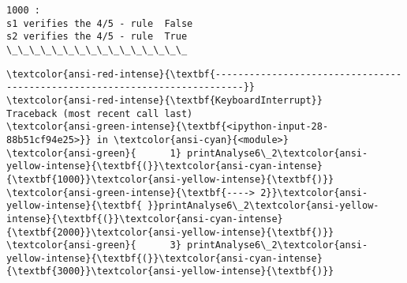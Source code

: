\documentclass[11pt]{article}
\begin{document}
    \begin{Verbatim}[commandchars=\\\{\}]
1000 :
s1 verifies the 4/5 - rule  False
s2 verifies the 4/5 - rule  True
\_\_\_\_\_\_\_\_\_\_\_\_\_\_\_\_
    \end{Verbatim}

    \begin{Verbatim}[commandchars=\\\{\}, frame=single, framerule=2mm, rulecolor=\color{outerrorbackground}]
\textcolor{ansi-red-intense}{\textbf{---------------------------------------------------------------------------}}
\textcolor{ansi-red-intense}{\textbf{KeyboardInterrupt}}                         Traceback (most recent call last)
\textcolor{ansi-green-intense}{\textbf{<ipython-input-28-88b51cf94e25>}} in \textcolor{ansi-cyan}{<module>}
\textcolor{ansi-green}{      1} printAnalyse6\_2\textcolor{ansi-yellow-intense}{\textbf{(}}\textcolor{ansi-cyan-intense}{\textbf{1000}}\textcolor{ansi-yellow-intense}{\textbf{)}}
\textcolor{ansi-green-intense}{\textbf{----> 2}}\textcolor{ansi-yellow-intense}{\textbf{ }}printAnalyse6\_2\textcolor{ansi-yellow-intense}{\textbf{(}}\textcolor{ansi-cyan-intense}{\textbf{2000}}\textcolor{ansi-yellow-intense}{\textbf{)}}
\textcolor{ansi-green}{      3} printAnalyse6\_2\textcolor{ansi-yellow-intense}{\textbf{(}}\textcolor{ansi-cyan-intense}{\textbf{3000}}\textcolor{ansi-yellow-intense}{\textbf{)}}


\end{Verbatim}
\end{document}
